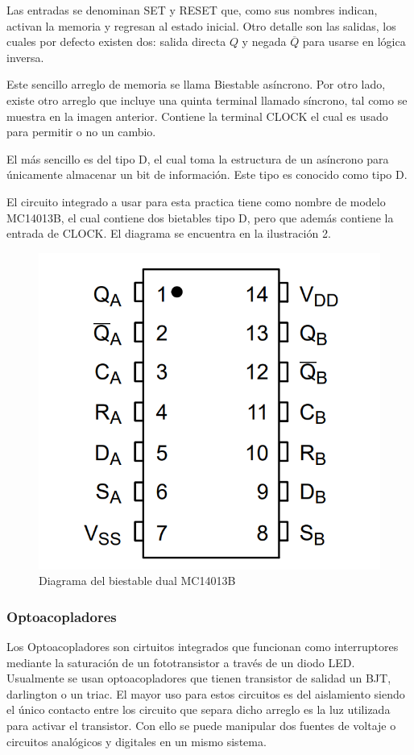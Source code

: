 Las entradas se denominan SET y RESET que, como sus nombres indican, activan la memoria y regresan al estado inicial.
Otro detalle son las salidas, los cuales por defecto existen dos: salida directa \(Q\) y negada \(\overline{Q}\) para 
usarse en lógica inversa.

Este sencillo arreglo de memoria se llama Biestable asíncrono. Por otro lado, existe otro arreglo que incluye una quinta
terminal llamado síncrono, tal como se muestra en la imagen anterior. Contiene la terminal CLOCK el cual es usado para
permitir o no un cambio.

El más sencillo es del tipo D, el cual toma la estructura de un asíncrono para únicamente almacenar un bit de información.
Este tipo es conocido como tipo D. 

El circuito integrado a usar para esta practica tiene como nombre de modelo MC14013B, el cual contiene dos bietables tipo D, 
pero que además contiene la entrada de CLOCK. El diagrama se encuentra en la ilustración 2.

\begin{figure}
    \centering
    \includegraphics[scale=0.5]{media/MC14013B.png}
    \caption{Diagrama del biestable dual MC14013B}
    \label{Fig: Diagrama del biestable dual MC14013B}
\end{figure}

\subsubsection{Optoacopladores}
Los Optoacopladores son cirtuitos integrados que funcionan como interruptores mediante la saturación de un fototransistor
a través de un diodo LED. Usualmente se usan optoacopladores que tienen transistor de salidad un BJT, darlington o un triac.
El mayor uso para estos circuitos es del aislamiento siendo el único contacto entre los circuito que separa dicho arreglo
es la luz utilizada para activar el transistor. Con ello se puede manipular dos fuentes de voltaje o circuitos analógicos y 
digitales en un mismo sistema. \parencite{bera2012opto}

